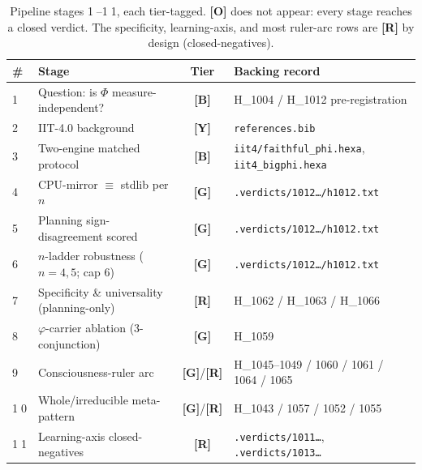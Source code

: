 \documentclass[11pt,a4paper]{article}
\providecommand{\tierBlue}{\textcolor{blue!60!black}{\textbf{[B]}}}
\providecommand{\tierGreen}{\textcolor{green!50!black}{\textbf{[G]}}}
\providecommand{\tierYellow}{\textcolor{yellow!55!black}{\textbf{[Y]}}}
\providecommand{\tierOrange}{\textcolor{orange!80!black}{\textbf{[O]}}}
\providecommand{\tierRed}{\textcolor{red!70!black}{\textbf{[R]}}}
\begin{document}
\medskip
\begin{table}[h]
\centering
\small
\begin{tabular}{@{}>{\centering\arraybackslash}m{0.4cm} >{\raggedright\arraybackslash}m{4.6cm} c >{\raggedright\arraybackslash}m{6cm}@{}}
\toprule
\textbf{\#} & \textbf{Stage} & \textbf{Tier} & \textbf{Backing record} \\
\midrule
\textcircled{\scriptsize 1} & Question: is $\Phi$ measure-independent?  & \tierBlue   & H\_1004 / H\_1012 pre-registration \\
\textcircled{\scriptsize 2} & IIT-4.0 background                        & \tierYellow & \texttt{references.bib} \\
\textcircled{\scriptsize 3} & Two-engine matched protocol               & \tierBlue   & \texttt{iit4/faithful\_phi.hexa}, \texttt{iit4\_bigphi.hexa} \\
\textcircled{\scriptsize 4} & CPU-mirror $\equiv$ stdlib per $n$        & \tierGreen  & \texttt{.verdicts/1012\dots/h1012.txt} \\
\textcircled{\scriptsize 5} & Planning sign-disagreement scored         & \tierGreen  & \texttt{.verdicts/1012\dots/h1012.txt} \\
\textcircled{\scriptsize 6} & $n$-ladder robustness ($n=4,5$; cap $6$)  & \tierGreen  & \texttt{.verdicts/1012\dots/h1012.txt} \\
\textcircled{\scriptsize 7} & Specificity \& universality (planning-only) & \tierRed   & H\_1062 / H\_1063 / H\_1066 \\
\textcircled{\scriptsize 8} & $\varphi$-carrier ablation (3-conjunction) & \tierGreen  & H\_1059 \\
\textcircled{\scriptsize 9} & Consciousness-ruler arc                   & \tierGreen/\tierRed & H\_1045--1049 / 1060 / 1061 / 1064 / 1065 \\
\textcircled{\scriptsize 10} & Whole/irreducible meta-pattern           & \tierGreen/\tierRed & H\_1043 / 1057 / 1052 / 1055 \\
\textcircled{\scriptsize 11} & Learning-axis closed-negatives           & \tierRed    & \texttt{.verdicts/1011\dots}, \texttt{.verdicts/1013\dots} \\
\bottomrule
\end{tabular}
\caption{Pipeline stages \textcircled{\scriptsize 1}--\textcircled{\scriptsize 11},
each tier-tagged. \tierOrange{} does not appear: every stage reaches a
closed verdict. The specificity, learning-axis, and most ruler-arc rows are
\tierRed{} by design (closed-negatives).}
\label{tab:pipeline}
\end{table}
\end{document}
